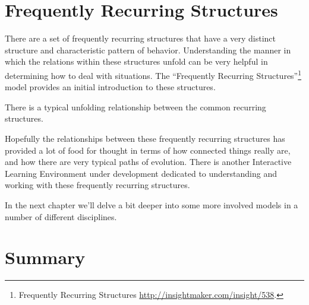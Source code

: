\documentclass[]{memoir}
\begin{document}
\section{Frequently Recurring Structures}

There are a set of frequently recurring structures that have a very
distinct structure and characteristic pattern of behavior. Understanding
the manner in which the relations within these structures unfold can be
very helpful in determining how to deal with situations. The
``Frequently Recurring Structures''\footnote{Frequently Recurring
  Structures \url{http://insightmaker.com/insight/538}.} model provides
an initial introduction to these structures.

\FloatBarrier 

\begin{model}[frametitle={Model: Frequently Recurring Structures}] 

 There is a typical unfolding relationship between the common recurring structures.




 \end{model}

Hopefully the relationships between these frequently recurring
structures has provided a lot of food for thought in terms of how
connected things really are, and how there are very typical paths of
evolution. There is another Interactive Learning Environment under
development dedicated to understanding and working with these frequently
recurring structures.

In the next chapter we'll delve a bit deeper into some more involved
models in a number of different disciplines.

\section{Summary}
\end{document}

